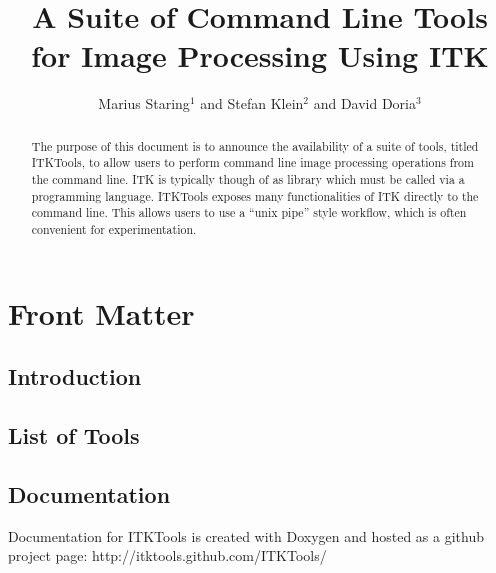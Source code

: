\documentclass{InsightArticle}
\title{A Suite of Command Line Tools for Image Processing Using ITK}
\author{Marius Staring$^{1}$ and Stefan Klein$^{2}$ and David Doria$^{3}$ }
\newcommand{\IJhandlerIDnumber}{3258}
\begin{document}
%
%
\IJhandlefooter{\IJhandlerIDnumber}


\ifpdf
\else
\fi

\maketitle

\ifhtml
\chapter*{Front Matter\label{front}}
\fi

\begin{abstract}
\noindent The purpose of this document is to announce the availability of a suite of tools, titled ITKTools, to allow users 
to perform command line image processing operations from the command line. ITK is typically though of as library which must be called via a programming language. ITKTools exposes many functionalities of ITK directly to the command line. This allows users to use a ``unix pipe'' style workflow, which is often convenient for experimentation.

\end{abstract}

\IJhandlenote{\IJhandlerIDnumber}

\tableofcontents


\section{Introduction}

\section{List of Tools}

\section{Documentation}

Documentation for ITKTools is created with Doxygen and hosted as a github project page:
http://itktools.github.com/ITKTools/



%
%
\end{document}
